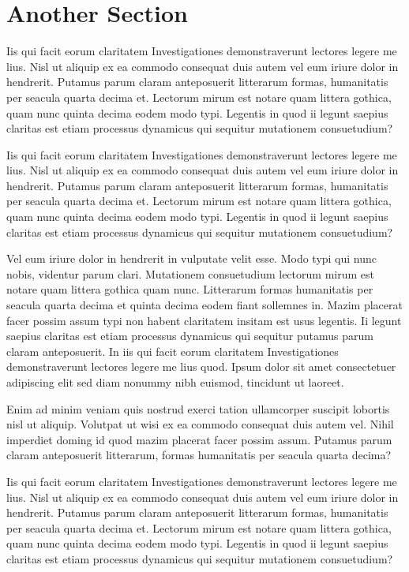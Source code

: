 \section{Another Section}
 Iis qui facit eorum claritatem Investigationes demonstraverunt lectores legere me lius. Nisl ut aliquip ex ea commodo consequat duis autem vel eum iriure dolor in hendrerit. Putamus parum claram anteposuerit litterarum formas, humanitatis per seacula quarta decima et. Lectorum mirum est notare quam littera gothica, quam nunc quinta decima eodem modo typi. Legentis in quod ii legunt saepius claritas est etiam processus dynamicus qui sequitur mutationem consuetudium?

 Iis qui facit eorum claritatem Investigationes demonstraverunt lectores legere me lius. Nisl ut aliquip ex ea commodo consequat duis autem vel eum iriure dolor in hendrerit. Putamus parum claram anteposuerit litterarum formas, humanitatis per seacula quarta decima et. Lectorum mirum est notare quam littera gothica, quam nunc quinta decima eodem modo typi. Legentis in quod ii legunt saepius claritas est etiam processus dynamicus qui sequitur mutationem consuetudium?

Vel eum iriure dolor in hendrerit in vulputate velit esse. Modo typi qui nunc nobis, videntur parum clari. Mutationem consuetudium lectorum mirum est notare quam littera gothica quam nunc. Litterarum formas humanitatis per seacula quarta decima et quinta decima eodem fiant sollemnes in. Mazim placerat facer possim assum typi non habent claritatem insitam est usus legentis. Ii legunt saepius claritas est etiam processus dynamicus qui sequitur putamus parum claram anteposuerit. In iis qui facit eorum claritatem Investigationes demonstraverunt lectores legere me lius quod. Ipsum dolor sit amet consectetuer adipiscing elit sed diam nonummy nibh euismod, tincidunt ut laoreet.

Enim ad minim veniam quis nostrud exerci tation ullamcorper suscipit lobortis nisl ut aliquip. Volutpat ut wisi ex ea commodo consequat duis autem vel. Nihil imperdiet doming id quod mazim placerat facer possim assum. Putamus parum claram anteposuerit litterarum, formas humanitatis per seacula quarta decima?

Iis qui facit eorum claritatem Investigationes demonstraverunt lectores legere me lius. Nisl ut aliquip ex ea commodo consequat duis autem vel eum iriure dolor in hendrerit. Putamus parum claram anteposuerit litterarum formas, humanitatis per seacula quarta decima et. Lectorum mirum est notare quam littera gothica, quam nunc quinta decima eodem modo typi. Legentis in quod ii legunt saepius claritas est etiam processus dynamicus qui sequitur mutationem consuetudium?
 

